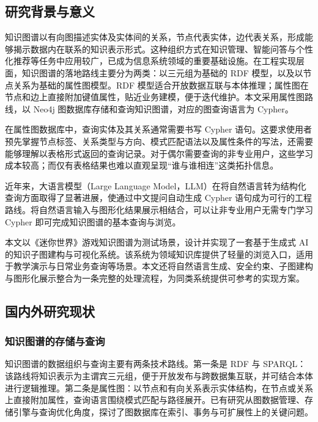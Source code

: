 \documentclass[12pt,a4paper]{article}
\begin{document}
\subsection{研究背景与意义}

知识图谱以有向图描述实体及实体间的关系，节点代表实体，边代表关系，形成能够揭示数据内在联系的知识表示形式。这种组织方式在知识管理、智能问答与个性化推荐等任务中应用较广，已成为信息系统领域的重要基础设施\cite{ref17}。在工程实现层面，知识图谱的落地路线主要分为两类：以三元组为基础的 RDF 模型，以及以节点关系为基础的属性图模型。RDF 模型适合开放数据互联与本体推理；属性图在节点和边上直接附加键值属性，贴近业务建模，便于迭代维护\cite{ref1,ref3}。本文采用属性图路线，以 Neo4j 图数据库存储和查询知识图谱，对应的图查询语言为 Cypher。

在属性图数据库中，查询实体及其关系通常需要书写 Cypher 语句。这要求使用者预先掌握节点标签、关系类型与方向、模式匹配语法以及属性条件的写法，还需要能够理解以表格形式返回的查询记录。对于偶尔需要查询的非专业用户，这些学习成本较高；而仅有表格结果也难以直观呈现“谁与谁相连”这类拓扑信息。

近年来，大语言模型（Large Language Model，LLM）在将自然语言转为结构化查询方面取得了显著进展\cite{ref4,ref11}，使通过中文提问自动生成 Cypher 语句成为可行的工程路线。将自然语言输入与图形化结果展示相结合，可以让非专业用户无需专门学习 Cypher 即可完成知识图谱的基本查询与浏览。

本文以《迷你世界》游戏知识图谱为测试场景，设计并实现了一套基于生成式 AI 的知识子图建构与可视化系统。该系统为领域知识库提供了轻量的浏览入口，适用于教学演示与日常业务查询等场景。本文还将自然语言生成、安全约束、子图建构与图形化展示整合为一条完整的处理流程，为同类系统提供可参考的实现方案。

\subsection{国内外研究现状}

\subsubsection{知识图谱的存储与查询}

知识图谱的数据组织与查询主要有两条技术路线。第一条是 RDF 与 SPARQL：该路线将知识表示为主谓宾三元组，便于开放发布与跨数据集互联，并可结合本体进行逻辑推理\cite{ref17}。第二条是属性图：以节点和有向关系表示实体结构，在节点或关系上直接附加属性，查询语言围绕模式匹配与路径展开。已有研究从图数据管理、存储引擎与查询优化角度，探讨了图数据库在索引、事务与可扩展性上的关键问题\cite{ref1,ref2,ref3}。
\end{document}
